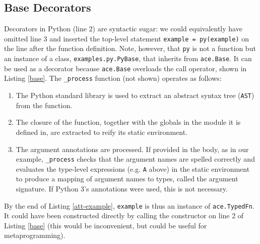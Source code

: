 \documentclass[10pt,preprint]{sigplanconf}
\begin{document}
{\subsection{Base Decorators}
Decorators in Python (line 2) are syntactic sugar: we could equivalently have omitted line 3 and inserted the top-level statement \verb|example = py(example)| on the line after the function definition. Note, however, that \verb|py| is not a function but an instance of a class, \verb|examples.py.PyBase|, that inherits from \verb|ace.Base|. It can be used as a decorator because \verb|ace.Base| overloads the call operator, shown in Listing \ref{base}. The \verb|_process| function (not shown) operates as follows:
\begin{enumerate}
\item The Python standard library is used to extract an abstract syntax tree (\verb|AST|) from the function.
\item The closure of the function, together with the globals in the module it is defined in, are extracted to reify its static environment.
\item The argument annotations are processed. If provided in the body, as in our example, \verb|_process| checks that the argument names are spelled correctly and evaluates the type-level expressions (e.g. \verb|A| above) in the static environment to produce a mapping of argument names to types, called the argument signature. If Python 3's annotations were used, this is not necessary.
\end{enumerate}
By the end of Listing \ref{att-example}, \verb|example| is thus an instance of \verb|ace.TypedFn|. It could  have been constructed directly by calling the constructor on line 2 of Listing \ref{base} (this would be inconvenient, but could be useful for metaprogramming). 

}
\end{document}
